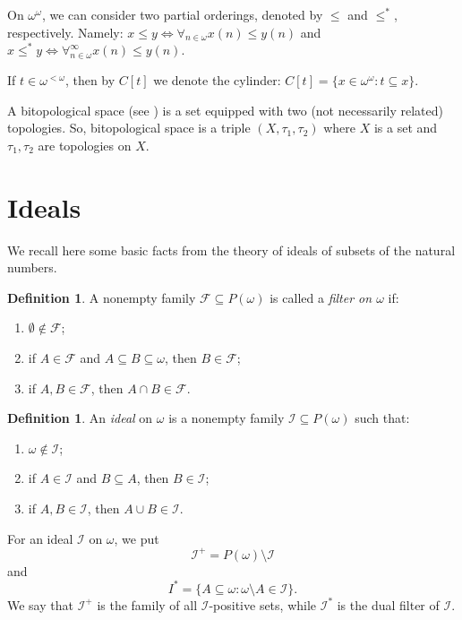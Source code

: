 \documentclass[12pt]{amsart}
\theoremstyle{plain}
\theoremstyle{definition}
\newtheorem{definition}[theorem]{Definition}
\theoremstyle{remark}
\newcommand{\baire}{\omega^{\omega}}
\newcommand{\finbaire}{\omega^{<\omega}}
\newcommand{\calF}{\mathcal{F}}
\newcommand{\cI}{\mathcal{I}}
\begin{document}
On $\baire$, we can consider two partial orderings,
denoted by $\leq$ and $\leq^*$, respectively.
Namely:
$x \leq y \iff \forall_{n \in \omega} x(n) \leq y(n)$
and
$x \leq^* y \iff \forall_{n \in \omega}^{\infty} x(n) \leq y(n)$.

If $t \in \finbaire$, then by $C[t]$ we denote the cylinder:
$C[t] = \lbrace x \in \baire\colon t \subseteq x \rbrace$.

A bitopological space (see \cite{Kelly1963}) is a set equipped with two (not necessarily related) topologies.
So, bitopological space is a triple $(X,\tau_1,\tau_2)$
where $X$ is a set and $\tau_1,\tau_2$ are topologies on $X$.

\section{Ideals}

We recall here some basic facts from the theory of ideals of
subsets of the natural numbers.

\begin{definition}
A nonempty family $\calF\subseteq P(\omega)$ is called a
\emph{filter on $\omega$} if:
\begin{enumerate}
    \item $\emptyset\notin\calF$;
    \item if $A\in\calF$ and $A\subseteq B\subseteq\omega$,
    then $B\in\calF$;
    \item if $A,B\in\calF$, then $A\cap B\in\calF$.
\end{enumerate}
\end{definition}

\begin{definition}
An \emph{ideal} on $\omega$ is a nonempty family $\cI\subseteq P(\omega)$ such that:
\begin{enumerate}
    \item $\omega\notin \cI$;
    \item if $A\in \cI$ and $B\subseteq A$, then $B\in \cI$;
    \item if $A,B\in \cI$, then $A\cup B\in \cI$.
\end{enumerate}
\end{definition}

For an ideal $\cI$ on $\omega$, we put
\[
\cI^+ = P(\omega)\setminus \cI
\]
and
\[
I^* = \lbrace A\subseteq\omega \colon \omega\setminus A\in \cI\rbrace.
\]
We say that $\cI^+$ is the family of all $\cI$-positive sets, while $\cI^*$ is the dual filter of $\cI$.
\end{document}
